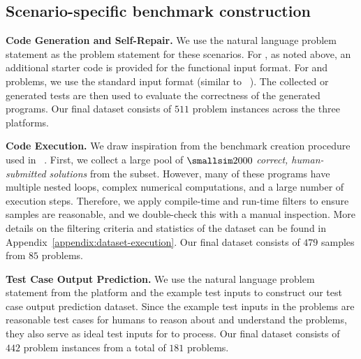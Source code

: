 
\subsection{Scenario-specific benchmark construction}
\label{subsec:scenario-specific}

\textbf{Code Generation and Self-Repair.}
We use the natural language problem statement as the problem statement for these scenarios. 
For \leetcode{}, as noted above, an additional starter code is provided for the functional input format.
For \atcoder{} and \codeforces{} problems, we use the standard input format (similar to ~\citet{hendrycks2021measuring}). 
The collected or generated tests are then used to evaluate the correctness of the generated programs.
Our final dataset consists of $511$ problem instances across the three platforms. 

\vspace{2pt}
\noindent \textbf{Code Execution.} 
We draw inspiration from the benchmark creation procedure used in ~\citet{gu2024cruxeval}. 
First, we collect a large pool of $\smallsim 2000$ \textit{correct, human-submitted solutions} from the \leetcode{} subset. 
However, many of these programs have multiple nested loops, complex numerical computations, and a large number of execution steps. 
Therefore, we apply compile-time and run-time filters to ensure samples are reasonable, and we double-check this with a manual inspection. 
More details on the filtering criteria and statistics of the dataset can be found in Appendix~\ref{appendix:dataset-execution}. 
Our final dataset consists of $479$ samples from $85$ problems.

\vspace{2pt}
\noindent \textbf{Test Case Output Prediction.} 
We use the natural language problem statement from the \leetcode{} platform and the example test inputs to construct our test case output prediction dataset.
Since the example test inputs in the problems are reasonable test cases for humans to reason about and understand the problems, they also serve as ideal test inputs for \llms{} to process.
Our final dataset consists of $442$ problem instances from a total of $181$ \leetcode{} problems.

